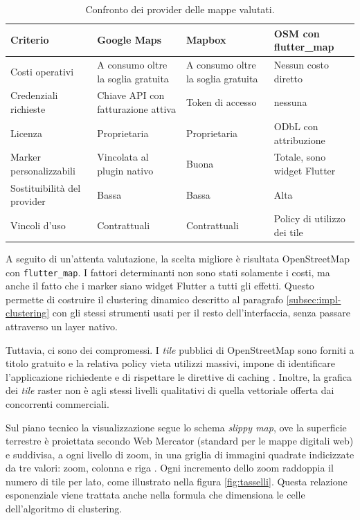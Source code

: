 \begin{table}[H]
\centering
\footnotesize
\begin{tabularx}{\textwidth}{@{}l L L L@{}}
\toprule
\textbf{Criterio} & \textbf{Google Maps} & \textbf{Mapbox} & \textbf{OSM con flutter\_map} \tabularnewline
\midrule
Costi operativi & A consumo oltre la soglia gratuita & A consumo oltre la soglia gratuita & Nessun costo diretto \tabularnewline
Credenziali richieste & Chiave API con fatturazione attiva & Token di accesso & nessuna \tabularnewline
Licenza & Proprietaria & Proprietaria & ODbL con attribuzione \tabularnewline
Marker personalizzabili & Vincolata al plugin nativo & Buona & Totale, sono widget Flutter \tabularnewline
Sostituibilità del provider & Bassa & Bassa & Alta \tabularnewline
Vincoli d'uso & Contrattuali & Contrattuali & Policy di utilizzo dei tile \tabularnewline
\bottomrule
\end{tabularx}
\caption{Confronto dei provider delle mappe valutati.}
\label{tab:confronto-piattaforme}
\end{table}

A seguito di un'attenta valutazione, la scelta migliore è risultata OpenStreetMap con \texttt{flutter\_map}.
I fattori determinanti non sono stati solamente i costi, ma anche il fatto che i marker siano widget Flutter
a tutti gli effetti.
Questo permette di costruire il clustering dinamico descritto al paragrafo \ref{subsec:impl-clustering}
con gli stessi strumenti usati per il resto dell'interfaccia, senza passare attraverso un layer nativo.

Tuttavia, ci sono dei compromessi.
I \textit{tile} pubblici di OpenStreetMap sono forniti a titolo gratuito e la relativa policy vieta utilizzi massivi, impone di
identificare l'applicazione richiedente e di rispettare le direttive di caching \cite{osmTilePolicy}.
Inoltre, la grafica dei \textit{tile} raster non è agli stessi livelli qualitativi di quella vettoriale offerta dai concorrenti commerciali.

Sul piano tecnico la visualizzazione segue lo schema \emph{slippy map}, ove la superficie terrestre è proiettata secondo Web Mercator
(standard per le mappe digitali web) e suddivisa, a ogni livello di zoom, in una griglia di immagini quadrate indicizzate
da tre valori: zoom, colonna e riga \cite{slippyMap}.
Ogni incremento dello zoom raddoppia il numero di tile per lato, come illustrato nella figura \ref{fig:tasselli}.
Questa relazione esponenziale viene trattata anche nella formula che dimensiona le celle dell'algoritmo di clustering.

